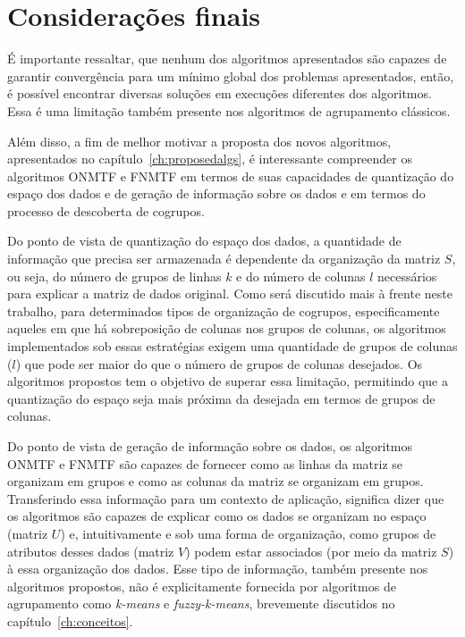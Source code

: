 \documentclass[
    12pt,                %
    oneside,            %
    a4paper,            %
    english,            %
    brazil                %
    ]{abntex2ppgsi}
\begin{document}

\section{Considerações finais}


É importante ressaltar, que nenhum dos algoritmos apresentados são capazes de garantir convergência para um mínimo global dos problemas apresentados, então, é possível encontrar diversas soluções em execuções diferentes dos algoritmos.
Essa é uma limitação também presente nos algoritmos de agrupamento clássicos.

Além disso, a fim de melhor motivar a proposta dos novos algoritmos, apresentados no capítulo~\ref{ch:proposedalgs}, é interessante compreender os algoritmos ONMTF e FNMTF em termos de suas capacidades de quantização do espaço dos dados e de geração de informação sobre os dados e em termos do processo de descoberta de cogrupos.

Do ponto de vista de quantização do espaço dos dados, a quantidade de informação que precisa ser armazenada é dependente da organização da matriz $S$, ou seja, do número de grupos de linhas $k$ e do número de colunas $l$ necessários para explicar a matriz de dados original.
Como será discutido mais à frente neste trabalho, para determinados tipos de organização de cogrupos, especificamente aqueles em que há sobreposição de colunas nos grupos de colunas, os algoritmos implementados sob essas estratégias exigem uma quantidade de grupos de colunas ($l$) que pode ser maior do que o número de grupos de colunas desejados.
Os algoritmos propostos tem o objetivo de superar essa limitação, permitindo que a quantização do espaço seja mais próxima da desejada em termos de grupos de colunas.

Do ponto de vista de geração de informação sobre os dados, os algoritmos ONMTF e FNMTF são capazes de fornecer como as linhas da matriz se organizam em grupos e como as colunas da matriz se organizam em grupos.
Transferindo essa informação para um contexto de aplicação, significa dizer que os algoritmos são capazes de explicar como os dados se organizam no espaço (matriz $U$) e, intuitivamente e sob uma forma de organização, como grupos de atributos desses dados (matriz $V$) podem estar associados (por meio da matriz $S$) à essa organização dos dados.
Esse tipo de informação, também presente nos algoritmos propostos, não é explicitamente fornecida por algoritmos de agrupamento como \textit{k-means} e \textit{fuzzy-k-means}, brevemente discutidos no capítulo~\ref{ch:conceitos}.
\end{document}
